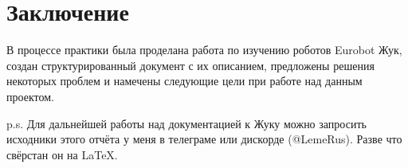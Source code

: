 \chapter*{Заключение}
В процессе практики была проделана работа по изучению роботов Eurobot Жук, создан структурированный документ с их описанием, предложены решения некоторых проблем и намечены следующие цели при работе над данным проектом.

p.s. Для дальнейшей работы над документацией к Жуку можно запросить исходники этого отчёта у меня в телеграме или дискорде (@LemeRus). Разве что свёрстан он на \LaTeX{}.
